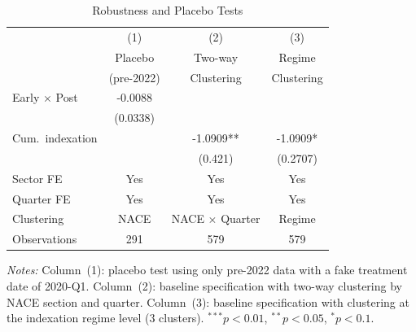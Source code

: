 \begin{table}[t]
\centering
\caption{Robustness and Placebo Tests}
\label{tab:robust}
\begin{tabular}{lccc}
\hline\hline
 & (1) & (2) & (3) \\
 & Placebo & Two-way & Regime \\
 & (pre-2022) & Clustering & Clustering \\
\hline
Early $\times$ Post & -0.0088 & & \\
 & (0.0338) & & \\
Cum.\ indexation & & -1.0909** & -1.0909* \\
 & & (0.421) & (0.2707) \\
\hline
Sector FE & Yes & Yes & Yes \\
Quarter FE & Yes & Yes & Yes \\
Clustering & NACE & NACE $\times$ Quarter & Regime \\
Observations & 291 & 579 & 579 \\
\hline\hline
\end{tabular}
\begin{tablenotes}[flushleft]
\small
\item \textit{Notes:} Column~(1): placebo test using only pre-2022 data with a fake treatment date of 2020-Q1. Column~(2): baseline specification with two-way clustering by NACE section and quarter. Column~(3): baseline specification with clustering at the indexation regime level (3 clusters). $^{***}p<0.01$, $^{**}p<0.05$, $^{*}p<0.1$.
\end{tablenotes}
\end{table}

